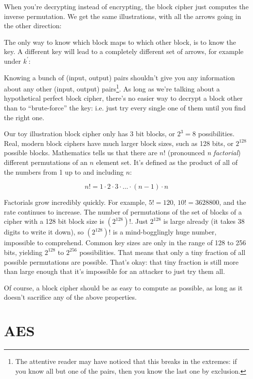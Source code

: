 \documentclass[11pt,ebook,table,dvipsnames]{memoir}
\begin{document}
When you're decrypting instead of encrypting, the block cipher just
computes the inverse permutation. We get the same illustrations, with
all the arrows going in the other direction:


The only way to know which block maps to which other block, is to know
the key. A different key will lead to a completely different set of
arrows, for example under $k^{\prime}$:


Knowing a bunch of (input, output) pairs shouldn't give you any
information about any other (input, output) pairs\footnote{The attentive
reader may have noticed that this breaks in the extremes: if you know
all but one of the pairs, then you know the last one by exclusion.}.
As long as we're talking about a hypothetical perfect block cipher,
there's no easier way to decrypt a block other than to \enquote{brute-force}
the key: i.e. just try every single one of them until you find the
right one.

Our toy illustration block cipher only has 3 bit blocks, or $2^3 = 8$
possibilities. Real, modern block ciphers have much larger block
sizes, such as 128 bits, or $2^{128}$ possible blocks. Mathematics
tells us that there are $n!$ (pronounced \emph{n factorial}) different
permutations of an $n$ element set. It's defined as the product of all
of the numbers from 1 up to and including $n$:

\[
n! = 1 \cdot 2 \cdot 3 \cdot \ldots \cdot (n - 1) \cdot n
\]

Factorials grow incredibly quickly. For example, $5! = 120$, $10! =
3628800$, and the rate continues to increase. The number of
permutations of the set of blocks of a cipher with a 128 bit block
size is $(2^{128})!$. Just $2^{128}$ is large already (it takes 38
digits to write it down), so $(2^{128})!$ is a mind-bogglingly huge
number, impossible to comprehend. Common key sizes are only in the
range of 128 to 256 bits, yielding $2^{128}$ to $2^{256}$
possibilities. That means that only a tiny fraction of all possible
permutations are possible. That's okay: that tiny fraction is still
more than large enough that it's impossible for an attacker to just
try them all.

Of course, a block cipher should be as easy to compute as possible,
as long as it doesn't sacrifice any of the above properties.
\section{\label{AES}AES}
\label{sec-2-2-2}
\end{document}
